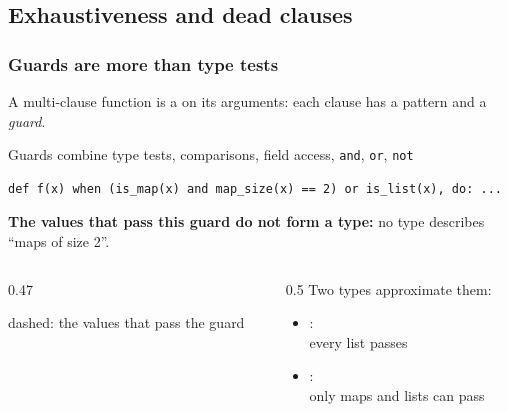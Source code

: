 \subsection{Exhaustiveness and dead clauses}

\begin{frame}[fragile,t]
\frametitle{Guards are more than type tests}
A multi-clause function is a  on its arguments: each clause has a pattern and a
\emph{guard}.
\begin{block}{Guards combine type tests, comparisons, field access, \texttt{and}, \texttt{or}, \texttt{not}}
\begin{verbatim}
def f(x) when (is_map(x) and map_size(x) == 2) or is_list(x), do: ...
\end{verbatim}
\end{block}
\pause
\textbf{\color{darkslateblue}The values that pass this guard do not form a type:} no type
describes ``maps of size 2''.
\pause
\begin{columns}[c,onlytextwidth]
\begin{column}{0.47\textwidth}
\centering
{}

{\scriptsize dashed: the values that pass the guard}
\end{column}
\begin{column}{0.5\textwidth}
Two types approximate them:
\begin{itemize}
\item {}: \\
      {\small every list passes}
\item {}: \\
      {\small only maps and lists can pass}
\end{itemize}
\end{column}
\end{columns}
\end{frame}

